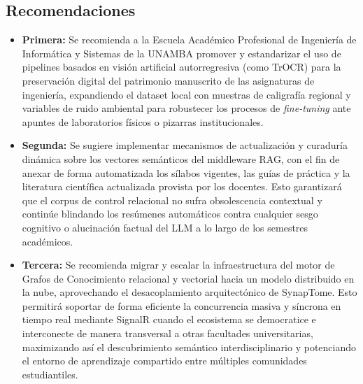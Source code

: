 \subsection{Recomendaciones}

\begin{itemize}

\item \textbf{Primera:} Se recomienda a la Escuela Académico Profesional de Ingeniería de Informática y Sistemas de la UNAMBA promover y estandarizar el uso de pipelines basados en visión artificial autorregresiva (como TrOCR) para la preservación digital del patrimonio manuscrito de las asignaturas de ingeniería, expandiendo el dataset local con muestras de caligrafía regional y variables de ruido ambiental para robustecer los procesos de \textit{fine-tuning} ante apuntes de laboratorios físicos o pizarras institucionales.

\item \textbf{Segunda:} Se sugiere implementar mecanismos de actualización y curaduría dinámica sobre los vectores semánticos del middleware RAG, con el fin de anexar de forma automatizada los sílabos vigentes, las guías de práctica y la literatura científica actualizada provista por los docentes. Esto garantizará que el corpus de control relacional no sufra obsolescencia contextual y continúe blindando los resúmenes automáticos contra cualquier sesgo cognitivo o alucinación factual del LLM a lo largo de los semestres académicos.

\item \textbf{Tercera:} Se recomienda migrar y escalar la infraestructura del motor de Grafos de Conocimiento relacional y vectorial hacia un modelo distribuido en la nube, aprovechando el desacoplamiento arquitectónico de SynapTome. Esto permitirá soportar de forma eficiente la concurrencia masiva y síncrona en tiempo real mediante SignalR cuando el ecosistema se democratice e interconecte de manera transversal a otras facultades universitarias, maximizando así el descubrimiento semántico interdisciplinario y potenciando el entorno de aprendizaje compartido entre múltiples comunidades estudiantiles.

\end{itemize}